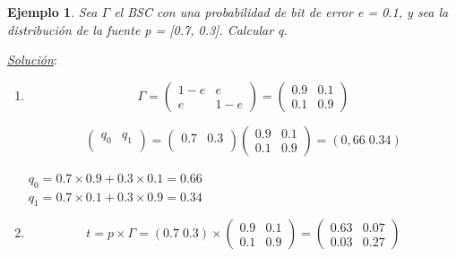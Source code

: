 \documentclass{beamer}
\theoremstyle{plain}
\theoremstyle{example}
\theoremstyle{example}
\newtheorem{ejemplo} [Ejemplo] {Ejemplo}
\begin{document}
\begin{frame}  \small 

\begin{ejemplo}

Sea $\Gamma$ el BSC con una probabilidad de bit de error  e = 0.1, y sea la distribución de la fuente p = [0.7, 0.3]. Calcular q.
\end{ejemplo}


\textit{\underline{Solución}}:\\
\vspace{0.3cm}

\begin{enumerate} \footnotesize
    \item \[
\Gamma =  \left( \begin{array}{cc}
           1-e       & e      \\
            e    & 1-e      
           \end{array}
    \right) =  \left( \begin{array}{cc}
           0.9       & 0.1     \\
            0.1    & 0.9      
           \end{array}
    \right) 
\]


\[
\left( \begin{array}{lc}
            q_{0}       & q_{1}      \\
           \end{array}
    \right)  = \left( \begin{array}{lc}
            0.7       & 0.3      \\
           \end{array}
    \right) \left( \begin{array}{cc}
            0.9       & 0.1      \\
            0.1    & 0.9      
           \end{array}
    \right)    = (0,66 \; 0.34)
\]

\begin{center}
$q_0	 = 0.7 \times 0.9 + 0.3 \times 0.1=0.66$ \\
$q_1	 = 0.7 \times 0.1 + 0.3 \times 0.9=0.34$
\end{center}


 \item 

 \[
 t = p \times \Gamma = (0.7 \; 0.3) \times 
     \left( \begin{array}{cc}
           0.9       & 0.1     \\
            0.1    & 0.9      
           \end{array}
    \right) =
     \left( \begin{array}{cc}
            0.63     & 0.07     \\
            0.03    & 0.27      
           \end{array}
    \right)
\]


\end{enumerate}
\end{frame}
\end{document}

